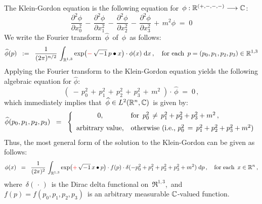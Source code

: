 \noindent
The Klein-Gordon equation is the following equation
for \,$\phi : \mathbb{R}^{(+,-,-,-)} \longrightarrow \mathbb{C}$:
\begin{equation*}
\dfrac{\partial^{2}\phi}{\partial x_{0}^{2}}
\,-\,
\dfrac{\partial^{2}\phi}{\partial x_{1}^{2}}
\,-\,
\dfrac{\partial^{2}\phi}{\partial x_{2}^{2}}
\,-\,
\dfrac{\partial^{2}\phi}{\partial x_{3}^{2}}
\,+\,
m^{2}\phi
\; = \;
0
\end{equation*}
We write the Fourier transform \,$\widehat{\phi}$\, of \,$\phi$\, as follows:
\begin{equation*}
\widehat{\phi}(p)
\;\; := \;\;
	\dfrac{1}{(2\pi)^{n/2}}\,
	\int_{\Re^{1,3}}
		\exp\!\left({\color{red}-}\,\sqrt{-1}\, p \overset{{\color{white}.}}{\bullet} x\right) \cdot \phi(x)
		\;\d x\,,
\quad
\textnormal{for each \,$p = (p_{0},p_{1},p_{2},p_{3}) \in \Re^{1,3}$}
\end{equation*}
Applying the Fourier transform to the Klein-Gordon equation yields
the following algebraic equation for $\widehat{\phi}$:
\begin{equation*}
\left(\;
	-\,
	p_{0}^{2}
	\,+\,
	p_{1}^{2}
	\,+\,
	p_{2}^{2}
	\,+\,
	p_{3}^{2}
	\,+\,
	m^{2}
	\;\right)
	\cdot\,\widehat{\phi}
\; = \;
	0\,,
\end{equation*}
which immediately implies that \,$\widehat{\phi} \in L^{2}(\mathbb{R}^{n},\mathbb{C})$\, is given by:
\begin{equation*}
\widehat{\phi}(p_{0},p_{1},p_{2},p_{3})
\;\; = \;\;
	\left\{\begin{array}{cl}
		0, & \textnormal{for \,$p_{0}^{2} \,\neq\, p_{1}^{2} + p_{2}^{2} + p_{3}^{2} + m^{2}$}\,,
		\\
		\overset{{\color{white}1}}{\textnormal{arbitrary value}}, & \textnormal{otherwise (i.e., $p_{0}^{2} \,=\, p_{1}^{2} + p_{2}^{2} + p_{3}^{2} + m^{2}$)}
		\end{array}\right.
\end{equation*}
Thus, the most general form of the solution to the Klein-Gordon can be given as follows:
\begin{equation*}
\phi(x)
\;\; = \;\;
	\dfrac{1}{(2\pi)^{2}}\,
	\int_{\Re^{1,3}}
		\exp\!\left({\color{red}+}\,\sqrt{-1}\, x \overset{{\color{white}.}}{\bullet} p\right)
		\cdot
		f(p)
		\cdot
		\delta(-p_{0}^{2} + p_{1}^{2} + p_{2}^{2} + p_{3}^{2} + m^{2})
		\;\d p\,,
\quad
\textnormal{for each \,$x \in \Re^{n}$}\,,
\end{equation*}
where
\,$\delta(\,\cdot\,)$\, is the Dirac delta functional on \,$\Re^{1,3}$,\, and
\,$f(p) = f(p_{0},p_{1},p_{2},p_{3})$\, is an arbitrary measurable $\mathbb{C}$-valued function.
